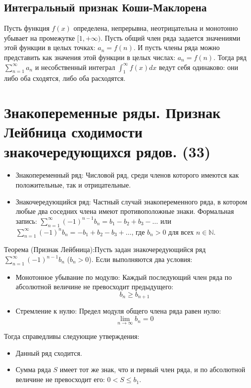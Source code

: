 \documentclass[14pt]{extreport}
\begin{document}
    \section{Интегральный признак Коши-Маклорена}
    \begin{theorem}
        Пусть функция $f(x)$ определена, непрерывна, неотрицательна и монотонно убывает на промежутке $[1, +\infty)$. Пусть общий член ряда задается значениями этой функции в целых точках: $a_n = f(n)$.
        И пусть члены ряда можно представить как значения этой функции в целых числах: $a_n = f(n)$. Тогда ряд $\sum_{n=1}^{\infty}a_n$ и несобственный интеграл $\int_{1}^{\infty}f(x) dx$ ведут себя одинаково: они либо оба сходятся, либо оба расходятся. 
    \end{theorem}

    \chapter{Знакопеременные ряды. Признак Лейбница сходимости 
    знакочередующихся рядов. (33)}
    \begin{definition}
        \begin{itemize}
            \item Знакопеременный ряд: Числовой ряд, среди членов которого имеются как положительные, так и отрицательные.
            \item Знакочередующийся ряд: Частный случай знакопеременного ряда, в котором любые два соседних члена имеют противоположные знаки.
            Формальная запись: $\sum_{n=1}^{\infty} (-1)^{n-1} b_n = b_1 - b_2 + b_3 - \dots$ или $\sum_{n=1}^{\infty} (-1)^n b_n = -b_1 + b_2 - b_3 + \dots$, где $b_n > 0$ для всех $n \in \mathbb{N}$.
        \end{itemize}
    \end{definition}

    \begin{theorem}
        Теорема (Признак Лейбница):Пусть задан знакочередующийся ряд $\sum_{n=1}^{\infty} (-1)^{n-1} b_n$ ($b_n > 0$). Если выполняются два условия:

        \begin{itemize}
            \item Монотонное убывание по модулю: Каждый последующий член ряда по абсолютной величине не превосходит предыдущего:$$b_n \ge b_{n+1}$$
            \item Стремление к нулю: Предел модуля общего члена ряда равен нулю:$$\lim_{n \to \infty} b_n = 0$$
        \end{itemize}

        Тогда справедливы следующие утверждения:

        \begin{itemize}
            \item Данный ряд сходится.
            \item Сумма ряда $S$ имеет тот же знак, что и первый член ряда, и по абсолютной величине не превосходит его: $0 < S \le b_1$.
        \end{itemize}

    \end{theorem}
\end{document}

